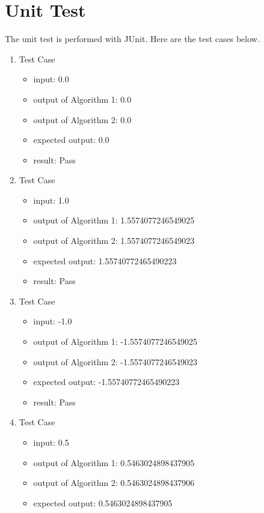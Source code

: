 \documentclass{article}
\begin{document}
\newpage
{}
\section{Unit Test}
The unit test is performed with JUnit. Here are the test cases below.
\begin{enumerate}
    \item Test Case 
    \begin{itemize}
        \item input: 0.0
        \item output of Algorithm 1: 0.0
        \item output of Algorithm 2: 0.0
        \item expected output: 0.0
        \item result: Pass
    \end{itemize}
    \item Test Case 
    \begin{itemize}
        \item input: 1.0
        \item output of Algorithm 1: 1.5574077246549025
        \item output of Algorithm 2: 1.5574077246549023
        \item expected output: 1.55740772465490223
        \item result: Pass
    \end{itemize}
    \item Test Case 
    \begin{itemize}
        \item input: -1.0
        \item output of Algorithm 1: -1.5574077246549025
        \item output of Algorithm 2: -1.5574077246549023
        \item expected output: -1.55740772465490223
        \item result: Pass
    \end{itemize}
    \item Test Case 
    \begin{itemize}
        \item input: 0.5
        \item output of Algorithm 1: 0.5463024898437905
        \item output of Algorithm 2: 0.5463024898437906
        \item expected output: 0.5463024898437905

\end{itemize}
\end{enumerate}
\end{document}

